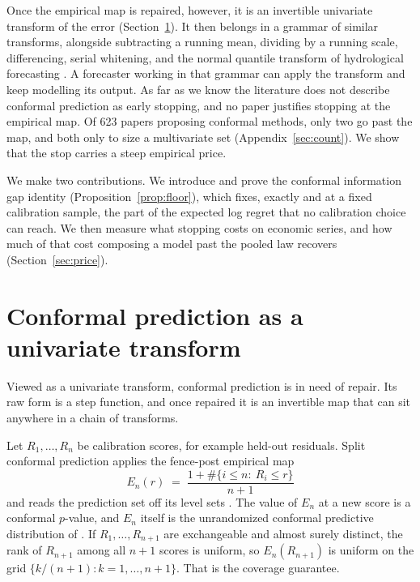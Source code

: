 \documentclass[11pt]{article}
\theoremstyle{remark}
\begin{document}
Once the empirical map is repaired, however, it is an
invertible univariate transform of the error (Section~\ref{sec:transform}). It then
belongs in a grammar of similar transforms, alongside subtracting a running mean,
dividing by a running scale, differencing, serial whitening, and the normal quantile
transform of hydrological forecasting \citep{bogner2012}. A forecaster working in that
grammar can apply the transform and keep modelling its output. As far as we know the
literature does not describe conformal prediction as early stopping, and no paper
justifies stopping at the empirical map. Of 623 papers proposing conformal methods,
only two go past the map, and both only to size a multivariate set
(Appendix~\ref{sec:count}). We show that the stop carries a steep
empirical price.

We make two contributions. We introduce and prove the conformal information gap
identity (Proposition~\ref{prop:floor}), which fixes, exactly and at a fixed
calibration sample, the part of the expected log regret that no calibration choice can
reach. We then measure what stopping costs on economic series, and how much of that
cost composing a model past the pooled law recovers (Section~\ref{sec:price}).

\section{Conformal prediction as a univariate transform}\label{sec:transform}

Viewed as a univariate transform, conformal prediction is in need of repair. Its raw form is a step function, and once repaired it is an invertible map
that can sit anywhere in a chain of transforms.

Let $R_1,\dots,R_n$ be calibration scores, for example held-out residuals. Split
conformal prediction applies the fence-post empirical map
\begin{equation}\label{eq:fencepost}
E_n(r) \;=\; \frac{1+\#\{i\le n:\ R_i\le r\}}{n+1}
\end{equation}
and reads the prediction set off its level sets
\citep{vovk2005algorithmic,lei2018distribution}. The value of $E_n$ at a new score is
a conformal $p$-value, and $E_n$ itself is the unrandomized conformal predictive
distribution of \citet{vovk2019nonparametric}. If $R_1,\dots,R_{n+1}$ are
exchangeable and almost surely distinct, the rank of $R_{n+1}$ among all $n+1$
scores is uniform, so $E_n(R_{n+1})$ is uniform on the grid
$\{k/(n+1):k=1,\dots,n+1\}$. That is the coverage guarantee.
\end{document}
